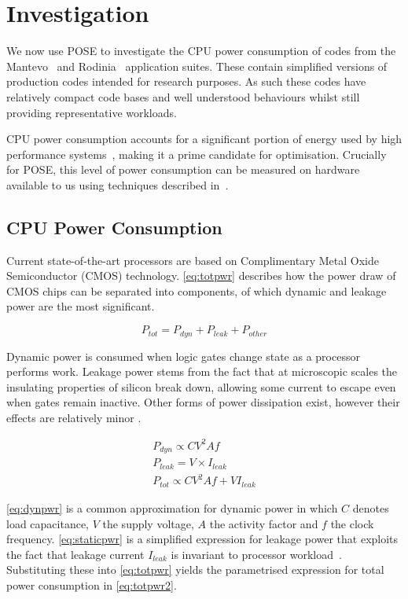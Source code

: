 \section{Investigation}
\label{sec:investigation}
We now use POSE to investigate the CPU power consumption of codes from the Mantevo~\cite{heroux:2009aa} and Rodinia~\cite{che:2009aa} application suites.
These contain simplified versions of production codes intended for research purposes.
As such these codes have relatively compact code bases and well understood behaviours whilst still providing representative workloads.

CPU power consumption accounts for a significant portion of energy used by high performance systems~\cite{rong:2010aa}, making it a prime candidate for optimisation.
Crucially for POSE, this level of power consumption can be measured on hardware available to us using techniques described in~\cite{hackenberg:2013aa}.

\subsection{CPU Power Consumption}
\label{ssec:cpupower}
Current state-of-the-art processors are based on Complimentary Metal Oxide Semiconductor (CMOS) technology.
\autoref{eq:totpwr} describes how the power draw of CMOS chips can be separated into components, of which dynamic and leakage power are the most significant.


\begin{equation}
\label{eq:totpwr}
P_{tot} = P_{dyn} + P_{leak} + P_{other}
\end{equation}


Dynamic power is consumed when logic gates change state as a processor performs work. 
Leakage power stems from the fact that at microscopic scales the insulating properties of silicon break down, allowing some current to escape even when gates remain inactive.
Other forms of power dissipation exist, however their effects are relatively minor \cite{kaxiras:2008aa}.

\begin{gather}
P_{dyn} \propto CV^{2}Af \label{eq:dynpwr} \\
P_{leak} = V \times I_{leak} \label{eq:staticpwr} \\
P_{tot} \propto CV^{2}Af + VI_{leak} \label{eq:totpwr2}
\end{gather}


\autoref{eq:dynpwr} is a common approximation for dynamic power in which $C$ denotes load capacitance, $V$ the supply voltage, $A$ the activity factor and $f$ the clock frequency. 
\autoref{eq:staticpwr} is a simplified expression for leakage power that exploits the fact that leakage current $I_{leak}$ is invariant to processor workload~\cite{kim:2003aa}.
Substituting these into \autoref{eq:totpwr} yields the parametrised expression for total power consumption in \autoref{eq:totpwr2}.

